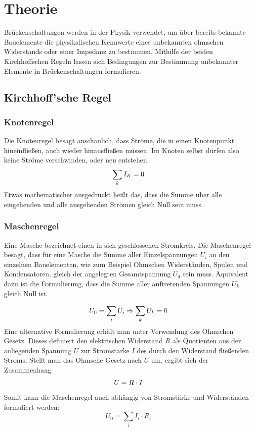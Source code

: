 \section{Theorie}
\label{sec:Theorie}
Brückenschaltungen werden in der Physik verwendet, um über bereits bekannte Bauelemente die
physikalischen Kennwerte eines unbekannten ohmschen Widerstands oder einer Impedanz zu bestimmen.
Mithilfe der beiden Kirchhoffschen Regeln lassen sich Bedingungen zur Bestimmung unbekannter Elemente in
Brückenschaltungen formulieren.
\subsection{Kirchhoff'sche Regel}

\subsubsection{Knotenregel}
Die Knotenregel besagt anschaulich, dass Ströme, die in einen Knotenpunkt
hineinfließen, auch wieder hinausfließen müssen. Im Knoten selbst dürfen also keine Ströme verschwinden,
oder neu entstehen.
\begin{equation}
  \centering
  \label{eqn:knotenregel}
\sum_{k}{I_K}=0
\end{equation}
Etwas mathematischer ausgedrückt heißt das, dass die Summe über alle eingehenden
und alle ausgehenden Strömen gleich Null sein muss.

\subsubsection{Maschenregel}
Eine Masche bezeichnet einen in sich geschlossenen Stromkreis.
Die Maschenregel besagt, dass für eine Masche die Summe aller Einzelspannungen $U_i$
an den einzelnen Bauelementen, wie zum Beispiel Ohmschen Widerständen, Spulen und Kondensatoren,
gleich der angelegten Gesamtspannung $U_0$ sein muss. Äquivalent dazu ist die Formulierung, dass die Summe aller auftretenden Spannungen $U_k$ gleich Null ist.

\begin{equation}
  \label{eqn:maschenregel}
  \centering
U_0=\sum_{i}{U_i} \Rightarrow \sum_{k}{U_k}=0
\end{equation}
 Eine alternative Formulierung erhält man unter Verwendung des Ohmschen Gesetz. Dieses definiert den elektrischen Widerstand $R$
 als Quotienten aus der anliegenden Spannung $U$ zur Stromstärke $I$ des durch den Widerstand fließenden Stroms.
 Stellt man das Ohmsche Gesetz nach $U$ um, ergibt sich der Zusammenhang
\begin{equation}
   \centering
   U=R \cdot I
 \end{equation}
 Somit kann die Maschenregel auch abhängig von Stromstärke und Widerständen formuliert werden:
 \begin{equation}
   U_0=\sum_{i}{I_i \cdot R_i}
\end{equation}



